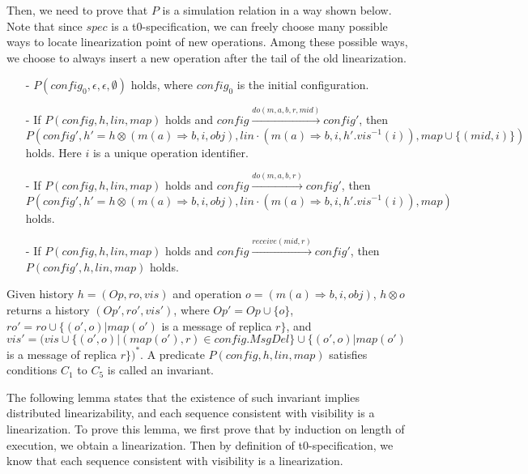 Then, we need to prove that $P$ is a simulation relation in a way shown below. Note that since $\mathit{spec}$ is a t0-specification, we can freely choose many possible ways to locate linearization point of new operations. Among these possible ways, we choose to always insert a new operation after the tail of the old linearization. 

\begin{itemize}
\setlength{\itemsep}{0.5pt}
\item[-] $P(\mathit{config}_0,\epsilon,\epsilon,\emptyset)$ holds, where $\mathit{config}_0$ is the initial configuration. 

\item[-] If $P(\mathit{config},h,\mathit{lin},\mathit{map})$ holds and $\mathit{config} {\xrightarrow{\mathit{do}(m,a,b,r,\mathit{mid})}} \mathit{config}'$, then $P(\mathit{config}', h' = h \otimes (m(a) \Rightarrow b,i,\mathit{obj}), \mathit{lin} \cdot (m(a) \Rightarrow b,i,h'.\mathit{vis}^{-1}(i)),\mathit{map} \cup \{ (\mathit{mid}, i) \})$ holds. Here $i$ is a unique operation identifier.

\item[-] If $P(\mathit{config},h,\mathit{lin},\mathit{map})$ holds and $\mathit{config} {\xrightarrow{\mathit{do}(m,a,b,r)}} \mathit{config}'$, then $P(\mathit{config}',h' = h \otimes (m(a) \Rightarrow b,i,\mathit{obj}), \mathit{lin} \cdot (m(a) \Rightarrow b,i,h'.\mathit{vis}^{-1}(i)),\mathit{map})$ holds.

\item[-] If $P(\mathit{config},h,\mathit{lin},\mathit{map})$ holds and $\mathit{config} {\xrightarrow{\mathit{receive}(\mathit{mid},r)}} \mathit{config}'$, then $P(\mathit{config}',h,\mathit{lin},\mathit{map})$ holds.
\end{itemize}

Given history $h = (\mathit{Op},\mathit{ro},\mathit{vis})$ and operation $o = (m(a) \Rightarrow b,i,\mathit{obj})$, $h \otimes o$ returns a history $(\mathit{Op}',\mathit{ro}',\mathit{vis}')$, where $\mathit{Op}' = \mathit{Op} \cup \{ o \}$, $\mathit{ro}' = \mathit{ro} \cup \{ (o',o) \vert \mathit{map}(o')$ is a message of replica $r \}$, and $\mathit{vis}' = (\mathit{vis} \cup \{ (o',o) \vert (\mathit{map}(o'),r) \in \mathit{config}.\mathit{MsgDel} \} \cup \{ (o',o) \vert \mathit{map}(o')$ is a message of replica $r \})^*$. A predicate $P(\mathit{config},h,\mathit{lin},\mathit{map})$ satisfies conditions $C_1$ to $C_5$ is called an invariant.

The following lemma states that the existence of such invariant implies distributed linearizability, and each sequence consistent with visibility is a linearization. To prove this lemma, we first prove that by induction on length of execution, we obtain a linearization. Then by definition of t0-specification, we know that each sequence consistent with visibility is a linearization. 

